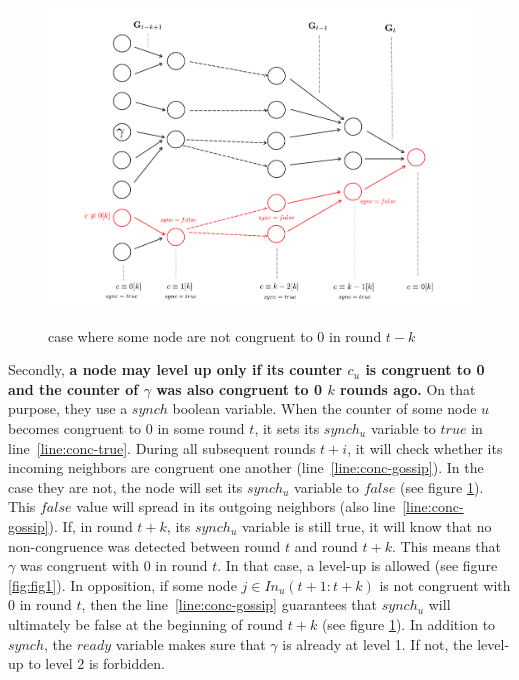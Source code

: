 \documentclass[11pt,letterpaper]{article}
\newcommand{\cent}{\gamma}
\begin{document}
\begin{figure}[h!]
	\centering
	\caption{case where some node are not congruent to 0 in round $t-k$}
	\includegraphics[width=0.7\columnwidth]{illustration-conc-2}
	\label{fig:fig2}
\end{figure}


Secondly, \textbf{a node may level up only if its counter $c_u$ is congruent to 0 and the counter of $\gamma$ was also congruent to 0 $k$ rounds ago.}
On that purpose, they use a $synch$ boolean variable.
When the counter of some node $u$ becomes congruent to 0 in some round $t$, it sets its $synch_u$ variable to $true$ in line~\ref{line:conc-true}.
During all subsequent rounds $t+i$, it will check whether its incoming neighbors are congruent one another (line~\ref{line:conc-gossip}).
In the case they are not, the node will set its $synch_u$ variable to $false$ (see figure \ref{fig:fig2}).
This $false$ value will spread in its outgoing neighbors (also line~\ref{line:conc-gossip}).
If, in round $t+k$, its $synch_u$ variable is still true, it will know that no non-congruence was detected between round $t$ and round $t+k$.
This means that $\cent$ was congruent with 0 in round $t$.
In that case, a level-up is allowed (see figure \ref{fig:fig1}).
In opposition, if some node $j \in In_u(t+1:t+k)$ is not congruent with 0 in round $t$,
then the line~\ref{line:conc-gossip} guarantees that $synch_u$ will ultimately be false at the beginning of round $t+k$ (see figure \ref{fig:fig2}).
In addition to $synch$, the $ready$ variable makes sure that $\cent$ is already at level 1.
If not, the level-up to level 2 is forbidden.
\end{document}
